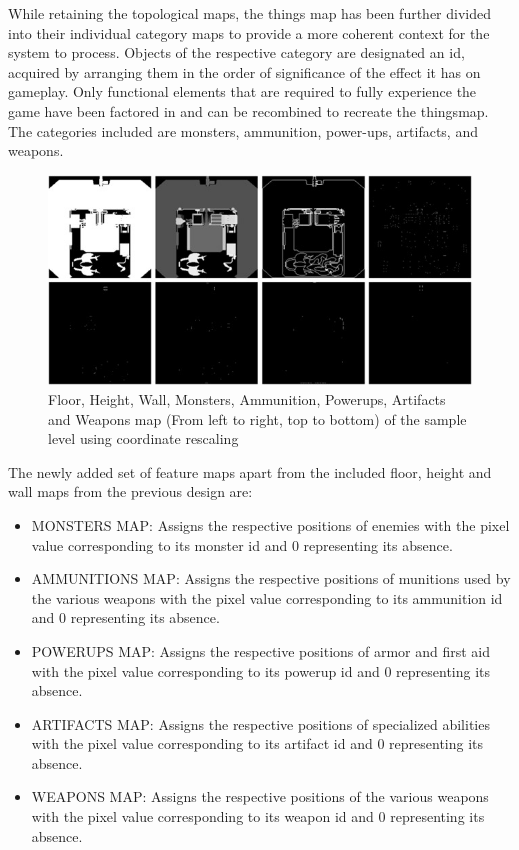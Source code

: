 \documentclass{Configuration_Files/PoliMi3i_thesis}
\begin{document}
While retaining the topological maps, the things map has been further divided into 
their individual category maps to provide a more coherent context for the system to 
process. Objects of the respective category are designated an id, acquired by 
arranging them in the order of significance of the effect it has on gameplay. Only 
functional elements that are required to fully experience the game have been factored 
in and can be recombined to recreate the thingsmap. The categories included are
monsters, ammunition, power-ups, artifacts, and weapons.
\begin{figure}[H]
    \centering
    \includegraphics[width=1\textwidth]{new_feature_maps.jpg}
    \caption[Updated feature maps of a sample level]{Floor, Height, Wall, Monsters, Ammunition, Powerups, Artifacts and 
Weapons map (From left to right, top to bottom) of the sample level using coordinate rescaling}
    \label{fig:newfeaturemaps}
\end{figure}
The newly added set of feature maps apart from the included floor, height and wall 
maps from the previous design are:
\begin{itemize}
\item MONSTERS MAP: Assigns the respective positions of enemies with the pixel 
value corresponding to its monster id and 0 representing its absence.
\item AMMUNITIONS MAP: Assigns the respective positions of munitions used by 
the various weapons with the pixel value corresponding to its ammunition id 
and 0 representing its absence.
\item POWERUPS MAP: Assigns the respective positions of armor and first aid with 
the pixel value corresponding to its powerup id and 0 representing its 
absence.
\item ARTIFACTS MAP: Assigns the respective positions of specialized abilities 
with the pixel value corresponding to its artifact id and 0 representing its 
absence.
\item WEAPONS MAP: Assigns the respective positions of the various weapons 
with the pixel value corresponding to its weapon id and 0 representing its 
absence.
\end{itemize}
\end{document}
